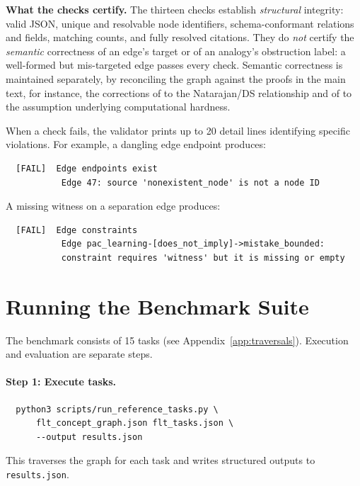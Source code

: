 \noindent\textbf{What the checks certify.}  The thirteen checks establish
\emph{structural} integrity: valid JSON, unique and resolvable node
identifiers, schema-conformant relations and fields, matching counts, and
fully resolved citations.  They do \emph{not} certify the \emph{semantic}
correctness of an edge's target or of an analogy's obstruction label: a
well-formed but mis-targeted edge passes every check.  Semantic correctness is
maintained separately, by reconciling the graph against the proofs in the main
text, for instance, the corrections of  to the
Natarajan/DS relationship and of  to the assumption
underlying computational hardness.

\noindent When a check fails, the validator prints up to 20 detail lines identifying specific violations.  For example, a dangling edge endpoint produces:

\begin{verbatim}
  [FAIL]  Edge endpoints exist
           Edge 47: source 'nonexistent_node' is not a node ID
\end{verbatim}

\noindent A missing witness on a separation edge produces:

\begin{verbatim}
  [FAIL]  Edge constraints
           Edge pac_learning-[does_not_imply]->mistake_bounded:
           constraint requires 'witness' but it is missing or empty
\end{verbatim}

\section{Running the Benchmark Suite}
\label{sec:run-benchmark}

The benchmark consists of 15 tasks (see Appendix~\ref{app:traversals}).  Execution and evaluation are separate steps.

\paragraph{Step 1: Execute tasks.}
\begin{verbatim}
  python3 scripts/run_reference_tasks.py \
      flt_concept_graph.json flt_tasks.json \
      --output results.json
\end{verbatim}

\noindent This traverses the graph for each task and writes structured outputs to \texttt{results.json}.

